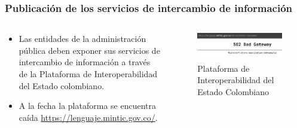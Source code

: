 \begin{frame}[allowframebreaks]

  \frametitle{Publicación de los servicios de intercambio de información}

  \begin{columns}
    \begin{column}{.5\textwidth}
      \begin{itemize}
        \item Las entidades de la administración pública deben exponer sus servicios de intercambio de información a través de la Plataforma de Interoperabilidad del Estado colombiano.
        \item A la fecha la plataforma se encuentra caída \url{https://lenguaje.mintic.gov.co/}.
      \end{itemize}  
    \end{column}

    \begin{column}{.5\textwidth}
      \begin{figure}[ht]
        \centering
        \includegraphics[width=\textwidth]{img/502.png}
        \caption{Plataforma de Interoperabilidad del Estado Colombiano\cite{MinTIC_MarcoInteroperabilidad}}
      \end{figure}

    \end{column}
  \end{columns}  


\end{frame}

